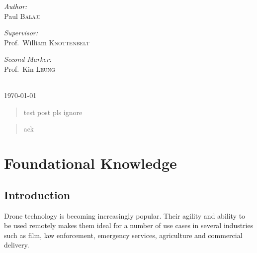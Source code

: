 \documentclass[a4paper,11pt,titlepage]{report}
\begin{document}
\begin{titlepage}
\begin{minipage}[t]{0.4\textwidth}
\begin{flushleft} \large
\emph{Author:}\\
Paul \textsc{Balaji} \\
\end{flushleft}
\end{minipage}
\begin{minipage}[t]{0.5\textwidth}
\begin{flushright} \large
\emph{Supervisor:} \\
Prof.~William \textsc{Knottenbelt}
\end{flushright}
\begin{flushright} \large
\emph{Second Marker:} \\
Prof.~Kin \textsc{Leung}
\end{flushright}
\end{minipage}\\[1cm]


{\large \today}\\[0.5cm] %


\vfill %

\end{titlepage}

\renewcommand{\abstractname}{\large Abstract}
\begin{abstract}
test post pls ignore
\end{abstract}

\renewcommand{\abstractname}{\large Acknowledgements}
\begin{abstract}
ack
\end{abstract}

\newpage

\tableofcontents

\newpage
\listoffigures

\newpage
\listoftables

\newpage
\part{Foundational Knowledge}
\chapter{Introduction}
Drone technology is becoming increasingly popular. Their agility and ability to be used remotely makes them ideal for a number of use cases in several industries such as film, law enforcement, emergency services, agriculture and commercial delivery\cite{Koontz}.
\end{document}
